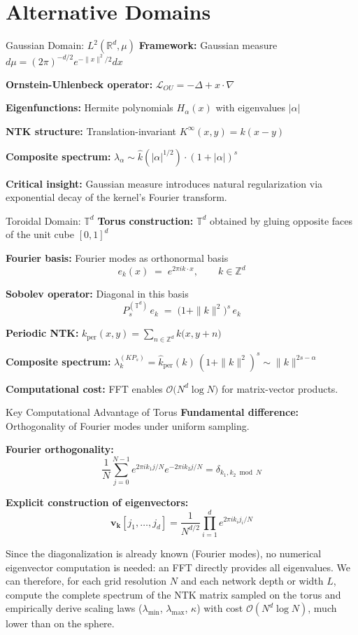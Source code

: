 \documentclass{beamer}
\begin{document}
\section{Alternative Domains}

\begin{frame}{Gaussian Domain: $L^2(\mathbb{R}^d, \mu)$}
\textbf{Framework:} Gaussian measure $d\mu = (2\pi)^{-d/2} e^{-\|x\|^2/2} dx$

\textbf{Ornstein-Uhlenbeck operator:} $\mathcal{L}_{OU} = -\Delta + x \cdot \nabla$

\textbf{Eigenfunctions:} Hermite polynomials $H_{\alpha}(x)$ with eigenvalues $|\alpha|$

\textbf{NTK structure:} Translation-invariant $K^{\infty}(x, y) = k(x - y)$

\textbf{Composite spectrum:} $\lambda_\alpha \sim \hat{k}(|\alpha|^{1/2}) \cdot (1 + |\alpha|)^s$

\textbf{Critical insight:} Gaussian measure introduces natural regularization via exponential decay of the kernel's Fourier transform.
\end{frame}

\begin{frame}{Toroidal Domain: $\mathbb{T}^d$}
\textbf{Torus construction:} $\mathbb{T}^d$ obtained by gluing opposite faces of the unit cube $[0,1]^d$

\textbf{Fourier basis:} Fourier modes as orthonormal basis
\[
   e_k(x) \;=\; e^{2\pi i k\cdot x}, \qquad k\in\mathbb Z^d
\]

\textbf{Sobolev operator:} Diagonal in this basis
\[
   P_s^{(\mathbb{T}^d)}\,e_k\;=\;\bigl(1+\|k\|^2\bigr)^{s}\,e_k
\]

\textbf{Periodic NTK:} $k_{\text{per}}(x,y)=\sum_{n\in\mathbb Z^d} k\bigl(x, y+n\bigr)$

\textbf{Composite spectrum:} $\lambda_k^{(KP_s)} = \widehat{k}_{\text{per}}(k)\,(1+\|k\|^2)^{s} \sim \|k\|^{2s-\alpha}$

\textbf{Computational cost:} FFT enables $\mathcal O\bigl(N^d\log N\bigr)$ for matrix-vector products.
\end{frame}

\begin{frame}{Key Computational Advantage of Torus}
\textbf{Fundamental difference:} Orthogonality of Fourier modes under uniform sampling.

\textbf{Fourier orthogonality:}
\[ \frac{1}{N} \sum_{j=0}^{N-1} e^{2\pi i k_1 j/N} e^{-2\pi i k_2 j/N} = \delta_{k_1, k_2 \bmod N} \]

\textbf{Explicit construction of eigenvectors:}
\[ \mathbf{v}_{\mathbf{k}}[j_1, \ldots, j_d] = \frac{1}{N^{d/2}} \prod_{i=1}^d e^{2\pi i k_i j_i/N} \]

Since the diagonalization is already known (Fourier modes), no numerical eigenvector computation is needed: an FFT directly provides all eigenvalues. We can therefore, for each grid resolution $N$ and each network depth or width $L$, compute the complete spectrum of the NTK matrix sampled on the torus and empirically derive scaling laws ($\lambda_{\min}$, $\lambda_{\max}$, $\kappa$) with cost $\mathcal{O}(N^{d}\log N)$, much lower than on the sphere.
\end{frame}
\end{document}
